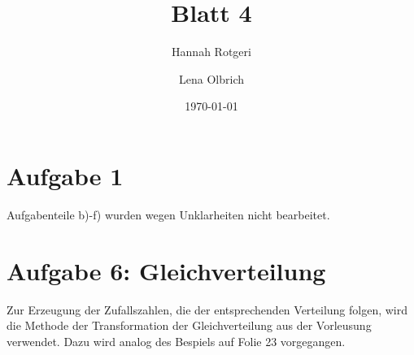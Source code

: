 \documentclass[11pt,a4paper]{article}
\title{Blatt 4}
\date{\today}
\author{Hannah Rotgeri \and Lena Olbrich}
\begin{document}
    \maketitle

    \section*{Aufgabe 1}
Aufgabenteile b)-f) wurden
wegen Unklarheiten nicht bearbeitet.
 



	\section*{Aufgabe 6: Gleichverteilung}

	Zur Erzeugung der Zufallszahlen, die der entsprechenden Verteilung folgen,
	wird die Methode der Transformation der Gleichverteilung aus der Vorleusung verwendet.
	Dazu wird analog des Bespiels auf Folie 23 vorgegangen.
\end{document}
